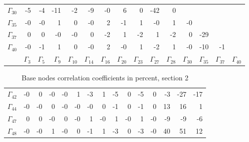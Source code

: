 {\begin{table}
\begin{center}
\begin{minipage}{\linewidth}
\begin{center}
\begin{envsmall}
\begin{center}
\begin{tabular}{rrrrrrrrrrrrrrr}
\( \Gamma_{30} \) &   -5 &   -4 &  -11 &   -2 &   -9 &   -0 &    6 &    0 &  -42 &    0 &  &  &  &  \\
\( \Gamma_{35} \) &   -0 &   -0 &    1 &    0 &   -0 &    2 &   -1 &    1 &   -0 &    1 &   -0 &  &  &  \\
\( \Gamma_{37} \) &    0 &    0 &   -0 &   -0 &    0 &   -2 &    1 &   -2 &    1 &   -2 &    0 &  -29 &  &  \\
\( \Gamma_{40} \) &   -0 &   -1 &    1 &    0 &   -0 &    2 &   -0 &    1 &   -2 &    1 &   -0 &  -10 &   -1 &  \\
 & \( \Gamma_{3} \) & \( \Gamma_{5} \) & \( \Gamma_{9} \) & \( \Gamma_{10} \) & \( \Gamma_{14} \) & \( \Gamma_{16} \) & \( \Gamma_{20} \) & \( \Gamma_{23} \) & \( \Gamma_{27} \) & \( \Gamma_{28} \) & \( \Gamma_{30} \) & \( \Gamma_{35} \) & \( \Gamma_{37} \) & \( \Gamma_{40} \)
\\\hline
\end{tabular}
\end{center}
\end{envsmall}
\ifhevea\else
\end{center}
\end{minipage}
\fi
\end{center}
\ifhevea\end{table}\fi
\ifhevea\begin{table}\fi%
\begin{center}
\ifhevea
\caption{Base nodes correlation coefficients in percent, section 2\label{tab:tau:br-fit-corr2}}%
\else
\begin{minipage}{\linewidth}
\begin{center}
\label{tab:tau:br-fit-corr2}%
\fi
\begin{envsmall}
\begin{center}
\renewcommand*{\arraystretch}{1.1}%
\begin{tabular}{rrrrrrrrrrrrrrr}
\hline
\( \Gamma_{42} \) &   -0 &    0 &   -0 &   -0 &    1 &   -3 &    1 &   -5 &    0 &   -5 &    0 &   -3 &  -27 &  -17 \\
\( \Gamma_{44} \) &   -0 &   -0 &    0 &   -0 &   -0 &   -0 &    0 &   -1 &    0 &   -1 &    0 &   13 &   16 &    1 \\
\( \Gamma_{47} \) &    0 &    0 &   -0 &    0 &   -0 &    1 &   -0 &    1 &   -0 &    1 &   -0 &   -9 &   -9 &   -6 \\
\( \Gamma_{48} \) &   -0 &   -0 &    1 &   -0 &    0 &   -1 &    1 &   -3 &    0 &   -3 &   -0 &   40 &   51 &   12 \\

\end{tabular}
\end{center}
\end{envsmall}
\end{center}
\end{minipage}
\end{center}
\end{table}}
